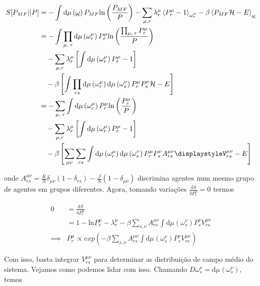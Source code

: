 \documentclass[a4paper, 11pt]{article} %
\newcommand{\msr}[1]{\ensuremath{\displaystyle%
    \mathrm{d}\mu\left(#1\right)}}
\newcommand{\agent}[2]{%
    \omega^{#2}_{#1}}
\newcommand{\conf}{%
    \underline \omega}
\newcommand{\pot}{\ensuremath{\displaystyle%
    V_{rs}^{\mu \nu}}}
\renewcommand{\H}{%
    \mathcal{H}}
\newcommand{\ln}{%
    \mathrm{ln}}
\newcommand{\inp}[1]{\ensuremath{\displaystyle%
    \left(#1\right)}}
\newcommand{\ina}[1]{\ensuremath{\displaystyle%
    \left<#1\right>}}
\newcommand{\ins}[1]{\ensuremath{\displaystyle%
    \left[#1\right]}}
\begin{document}
\begin{equation}
    \begin{split}
        S[P_{MF}||P] & = -\int
        \msr{\conf}P_{MF}\ln\inp{\frac{P_{MF}}{P}}
        -\sum_{\mu,r}\lambda_r^{\mu}\ina{P^{\mu}_r-1}_{\agent{r}{\mu}} 
        - \beta\ina{P_{MF}\mathcal{H} - E}_{\conf} \\
    & =  -\int
        \prod_{\mu,\;r}\msr{\agent{r}{\mu}}P^{\mu}_r
        \ln \inp{\frac{\prod_{\mu,\;r}P^{\mu}_r}{P}}\\
        &\quad -\sum_{\mu,r}\lambda_r^{\mu}\ins{\int \msr{\agent{r}{\mu}}
        P^{\mu}_r-1} \\
        &\quad -
        \beta\ins{\int\prod_{rs}\msr{\agent{r}{\mu}}\msr{\agent{s}{\nu}}
        P^{\mu}_rP^{\nu}_s\H-E}\\
    & =  -
        \sum_{\mu,\;r}\int\msr{\agent{r}{\mu}}P^{\mu}_r
        \ln \inp{\frac{P^{\mu}_r}{P}}\\
        &\quad -\sum_{\mu,r}\lambda_r^{\mu}\ins{\int \msr{\agent{r}{\mu}}
        P^{\mu}_r-1} \\
        &\quad -
        \beta\ins{\sum_{\mu\nu}\sum_{rs}\int\msr{\agent{r}{\mu}}
            \msr{\agent{s}{\nu}}P^{\mu}_rP^{\nu}_sA^{\mu\nu}_{rs}\pot-E}\\
    \end{split}
\end{equation}

onde $A_{rs}^{\mu\nu} = \frac{K}{N}\delta_{\mu\nu}(1-\delta_{rs}) - 
\frac{J}{N}(1-\delta_{\mu\nu})$
discrimina agentes num mesmo grupo de agentes em grupos diferentes. Agora,
tomando variações $\frac{\delta S}{\delta{P^{\mu}_r}} = 0$ termos

\begin{equation}\label{mean-field-p}
    \begin{split}
        0 & = \frac{\delta S}{\delta P^{\mu}_r} \\
          & = 1 - \ln P^{\mu}_r - \lambda_r^{\mu} 
        - \beta\sum_{s,\nu}A_{rs}^{\mu\nu}\int \msr{\agent{s}{\nu}}
        P^{\nu}_s \pot \\
        \implies & P_r^{\mu} \propto exp \inp{%
        - \beta\sum_{s,\nu}A_{rs}^{\mu\nu}\int \msr{\agent{s}{\nu}}
    P^{\nu}_s \pot }
    \end{split}
\end{equation}

Com isso, basta integrar $\pot$ para determinar as distribuição de
campo médio do sistema. Vejamos como podemos lidar com isso. Chamando
$D\agent{s}{\nu}=\msr{\agent{s}{\nu}}$, temos
\end{document}
